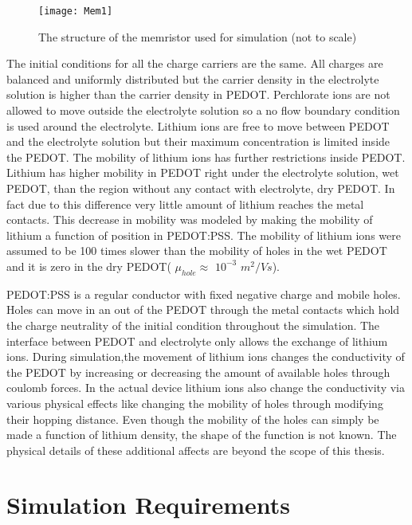 \begin{doublespace}
\begin{figure}[!htp]
\centering
\texttt{[image: Mem1]}
\caption{The structure of the memristor used for simulation (not to scale)} 
\label{MemStc}
\end{figure}


The initial conditions for all the charge carriers are the same. All charges are balanced and uniformly distributed but the carrier density in the electrolyte solution is higher than the carrier density in PEDOT. Perchlorate ions are not allowed to move outside the electrolyte solution so a no flow boundary condition is used around the electrolyte. Lithium ions are free to move between PEDOT and the electrolyte solution but their maximum concentration is limited inside the PEDOT. The mobility of lithium ions has further restrictions inside PEDOT. Lithium has higher mobility in PEDOT right under the electrolyte solution, wet PEDOT, than the region without any contact with electrolyte, dry PEDOT. In fact due to this difference very little amount of lithium reaches the metal contacts. This decrease in mobility was modeled by making the mobility of lithium a function of position in PEDOT:PSS. The mobility of lithium ions were assumed to be 100 times slower than the mobility of holes in the wet PEDOT and it is zero in the dry PEDOT( $\mu_{hole} \approx$ $10^{-3}$ $m^2/Vs$). 


PEDOT:PSS is a regular conductor with fixed negative charge and mobile holes. Holes can move in an out of the PEDOT through the metal contacts which hold the charge neutrality of the initial condition throughout the simulation. The interface between PEDOT and electrolyte only allows the exchange of lithium ions. During simulation,the movement of lithium ions changes the conductivity of the PEDOT by increasing or decreasing the amount of available holes through coulomb forces. In the actual device lithium ions also change the conductivity via various physical effects like changing the mobility of holes through modifying their hopping distance. Even though the mobility of the holes can simply be made a function of lithium density, the shape of the function is not known. The physical details of these additional affects are beyond the scope of this thesis. 




\clearpage
\section{Simulation Requirements}


\end{doublespace}
